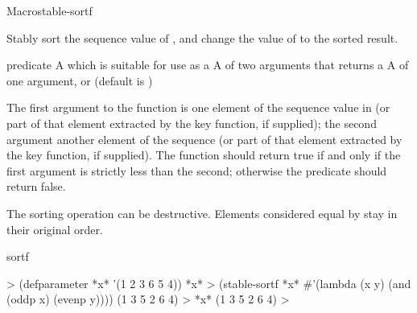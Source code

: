 \documentclass[10pt,twoside,english,pdftex]{article}
\begin{document}
\begin{functiondoc}{Macro}{stable-sortf}{
    }
%

\fnsyntax

\fnpurpose Stably sort the sequence value of , and change the value of
 to the sorted result.

\fnpackage {}

\fnmodule {}

\fnargs
\begin{args}{predicate}
\arg[place] A  which is suitable for use as a 
\arg[predicate] A  of two arguments that returns a
\arg[key] A  of one argument, or \nil{} (default is \nil)
\end{args}

\fndescription
%
The first argument to the  function is one element of the
sequence value in  (or part of that element extracted by the key
function, if supplied); the second argument another element of the sequence
(or part of that element extracted by the key function, if supplied). The
 function should return true if and only if the first
argument is strictly less than the second; otherwise the predicate should
return false.

The sorting operation can be destructive. Elements considered equal by
 stay in their original order.

\begin{alsos}{sortf}
\also[sortf]
\end{alsos}

\fnexample
\begin{example}
%
\W\supp
  > (defparameter *x* '(1 2 3 6 5 4))
  *x*
  > (stable-sortf *x* #'(lambda (x y) (and (oddp x) (evenp y))))
  (1 3 5 2 6 4)
  > *x*
  (1 3 5 2 6 4)
  >
\end{example}

\end{functiondoc}

\end{document}
